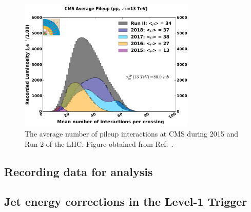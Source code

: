 \begin{figure}[htbp]
    \centering
    \includegraphics[width=0.75\textwidth]{figures/pileup_allYears_run2.pdf}
    \caption[The average number of pileup interactions at CMS during 2015 and Run-2 of the LHC]{The average number of pileup interactions at CMS during 2015 and Run-2 of the LHC. Figure obtained from Ref.~.}
    \label{fig:detector_cms_pileup}
\end{figure}




\subsection{Recording data for analysis}
\label{subsec:cms_recording_data}





\subsection{Jet energy corrections in the Level-1 Trigger}
\label{subsubsec:detector_jecs}

